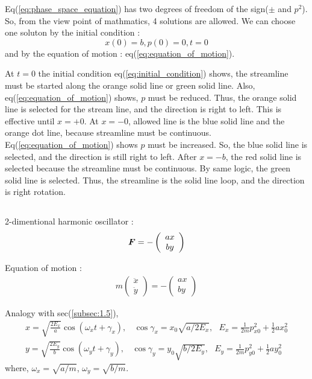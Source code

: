 \documentclass{jarticle}
\newcommand*{\mbold}[1]{\mbox{\boldmath $#1$}}
\begin{document}
Eq(\ref{eq:phase_space_equation}) has two degrees of freedom of the sign($\pm$ and $p^2$). So, from the view point of mathmatics, 4 solutions are allowed. 
We can choose one soluton by the initial condition : 
\begin{equation}\label{eq:initial_condition}
	x(0) = b, p(0) = 0, t=0
\end{equation}
and by the equation of motion : eq(\ref{eq:equation_of_motion}).

At $t=0$ the initial condition eq(\ref{eq:initial_condition}) shows, the streamline must be started along the orange solid line or green solid line. Also, eq(\ref{eq:equation_of_motion}) shows, $p$ must be reduced. Thus, the orange solid line is selected for the stream line, and the direction is right to left. This is effective until $x=+0$. 
At $x=-0$, allowed line is the blue solid line and the orange dot line, because streamline must be continuous. Eq(\ref{eq:equation_of_motion}) shows $p$ must be increased. So, the blue solid line is selected, and the direction is still right to left. After $x = -b$, the red solid line is selected because the streamline must be continuous. 
By same logic, the green solid line is selected. 
Thus, the streamline is the solid line loop, and the direction is right rotation.

\subsection{}
2-dimentional harmonic oscillator : 
\begin{eqnarray}
	\mbold{F} = -\left(\begin{array}{c} ax \\ by \end{array} \right) \nonumber
\end{eqnarray}

Equation of motion : 
\begin{eqnarray}
	m\left( \begin{array}{c} \ddot{x} \\ \ddot{y} \end{array} \right) =  -\left(\begin{array}{c} ax \\ by \end{array} \right) \nonumber
\end{eqnarray}

Analogy with sec(\ref{subsec:1.5}), 
\begin{eqnarray}
	x = \sqrt{\frac{2E_x}{a}}\cos(\omega_x t + \gamma_x), ~~~~ \cos\gamma_x = x_0\sqrt{a/2E_x},~~~ E_x = \frac{1}{2m}p_{x0}^2 + \frac{1}{2}ax_0^2 \nonumber \\
	y = \sqrt{\frac{2E_y}{b}}\cos(\omega_y t + \gamma_y), ~~~~ \cos\gamma_y = y_0\sqrt{b/2E_y},~~~ E_y = \frac{1}{2m}p_{y0}^2 + \frac{1}{2}ay_0^2 \nonumber 
\end{eqnarray}
where, $\omega_x = \sqrt{a/m}$, $\omega_y = \sqrt{b/m}$.
\end{document}
